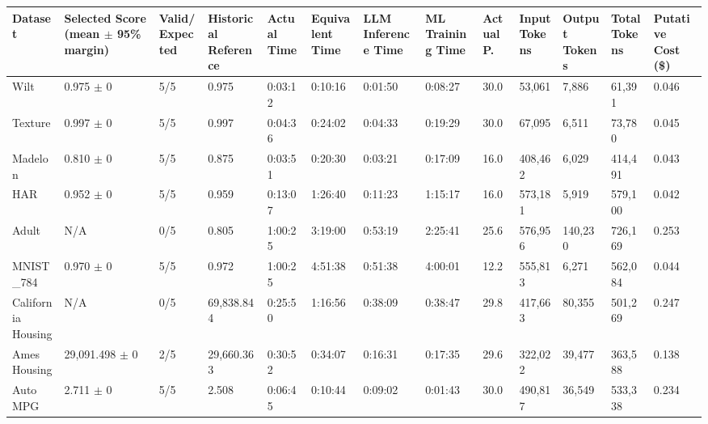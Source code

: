 \begin{tabular}{lllllllllllll}
\hline
Dataset & Selected Score (mean \ensuremath{\pm} 95\% margin) & Valid/Expected & Historical Reference & Actual Time & Equivalent Time & LLM Inference Time & ML Training Time & Actual P. & Input Tokens & Output Tokens & Total Tokens & Putative Cost (\$) \\
\hline
Wilt & 0.975 \ensuremath{\pm} 0 & 5/5 & 0.975 & 0:03:12 & 0:10:16 & 0:01:50 & 0:08:27 & 30.0 & 53,061 & 7,886 & 61,391 & 0.046 \\
Texture & 0.997 \ensuremath{\pm} 0 & 5/5 & 0.997 & 0:04:36 & 0:24:02 & 0:04:33 & 0:19:29 & 30.0 & 67,095 & 6,511 & 73,780 & 0.045 \\
Madelon & 0.810 \ensuremath{\pm} 0 & 5/5 & 0.875 & 0:03:51 & 0:20:30 & 0:03:21 & 0:17:09 & 16.0 & 408,462 & 6,029 & 414,491 & 0.043 \\
HAR & 0.952 \ensuremath{\pm} 0 & 5/5 & 0.959 & 0:13:07 & 1:26:40 & 0:11:23 & 1:15:17 & 16.0 & 573,181 & 5,919 & 579,100 & 0.042 \\
Adult & N/A & 0/5 & 0.805 & 1:00:25 & 3:19:00 & 0:53:19 & 2:25:41 & 25.6 & 576,956 & 140,230 & 726,169 & 0.253 \\
MNIST\_784 & 0.970 \ensuremath{\pm} 0 & 5/5 & 0.972 & 1:00:25 & 4:51:38 & 0:51:38 & 4:00:01 & 12.2 & 555,813 & 6,271 & 562,084 & 0.044 \\
California Housing & N/A & 0/5 & 69,838.844 & 0:25:50 & 1:16:56 & 0:38:09 & 0:38:47 & 29.8 & 417,663 & 80,355 & 501,269 & 0.247 \\
Ames Housing & 29,091.498 \ensuremath{\pm} 0 & 2/5 & 29,660.363 & 0:30:52 & 0:34:07 & 0:16:31 & 0:17:35 & 29.6 & 322,022 & 39,477 & 363,588 & 0.138 \\
Auto MPG & 2.711 \ensuremath{\pm} 0 & 5/5 & 2.508 & 0:06:45 & 0:10:44 & 0:09:02 & 0:01:43 & 30.0 & 490,817 & 36,549 & 533,338 & 0.234 \\
\hline
\end{tabular}
